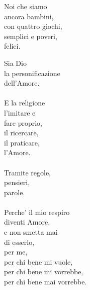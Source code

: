 \begin{haiku}
Noi che siamo\\
ancora bambini,\\
con quattro giochi,\\
semplici e poveri,\\
felici.\\
\end{haiku}

\begin{haiku}
    Sia Dio\\
    la personificazione\\
    dell'Amore.\\
    \leavevmode\\
    E la religione\\
    l'imitare e\\
    fare proprio,\\
    il ricercare,\\
    il praticare,\\
    l'Amore.\\
    \leavevmode\\
    Tramite regole, \\
    pensieri,\\
    parole.\\
    \leavevmode\\
    Perche' il mio respiro\\
    diventi Amore,\\
    e non smetta mai\\
    di esserlo,\\
    per me,\\
    per chi bene mi vuole,\\
    per chi bene mi vorrebbe,\\
    per chi bene mai vorrebbe.\\\
\end{haiku}




